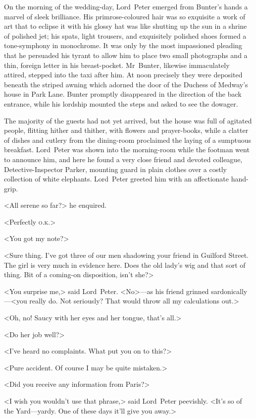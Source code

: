 \divider
On the morning of the wedding-day, Lord~Peter emerged from Bunter's hands a marvel of sleek brilliance. His primrose-coloured hair was so exquisite a work of art that to eclipse it with his glossy hat was like shutting up the sun in a shrine of polished jet; his spats, light trousers, and exquisitely polished shoes formed a tone-symphony in monochrome. It was only by the most impassioned pleading that he persuaded his tyrant to allow him to place two small photographs and a thin, foreign letter in his breast-pocket. Mr~Bunter, likewise immaculately attired, stepped into the taxi after him. At noon precisely they were deposited beneath the striped awning which adorned the door of the Duchess of Medway's house in Park Lane. Bunter promptly disappeared in the direction of the back entrance, while his lordship mounted the steps and asked to see the dowager.

The majority of the guests had not yet arrived, but the house was full of agitated people, flitting hither and thither, with flowers and prayer-books, while a clatter of dishes and cutlery from the dining-room proclaimed the laying of a sumptuous breakfast. Lord~Peter was shown into the morning-room while the footman went to announce him, and here he found a very close friend and devoted colleague, Detective-Inspector Parker, mounting guard in plain clothes over a costly collection of white elephants. Lord~Peter greeted him with an affectionate hand-grip.

<All serene so far?> he enquired.

<Perfectly \textsc{o.k.}>

<You got my note?>

<Sure thing. I've got three of our men shadowing your friend in Guilford Street. The girl is very much in evidence here. Does the old lady's wig and that sort of thing. Bit of a coming-on disposition, isn't she?>

<You surprise me,> said Lord~Peter. <No>—as his friend grinned sardonically—<you really do. Not seriously? That would throw all my calculations out.>

<Oh, no! Saucy with her eyes and her tongue, that's all.>

<Do her job well?>

<I've heard no complaints. What put you on to this?>

<Pure accident. Of course I may be quite mistaken.>

<Did you receive any information from Paris?>

<I wish you wouldn't use that phrase,> said Lord~Peter peevishly. <It's so of the Yard—yardy. One of these days it'll give you away.>

